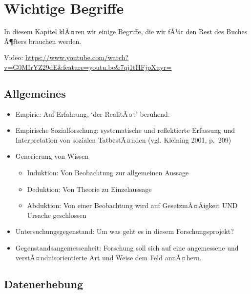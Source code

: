\documentclass[
]{book}
\providecommand{\tightlist}{%
  \setlength{\itemsep}{0pt}\setlength{\parskip}{0pt}}
\begin{document}
\hypertarget{wichtige-begriffe}{%
\chapter{Wichtige Begriffe}\label{wichtige-begriffe}}

In diesem Kapitel klÃ¤ren wir einige Begriffe, die wir fÃ¼r den Rest des Buches Ã¶fters brauchen werden.

Video: \url{https://www.youtube.com/watch?v=G0MIrYZ29dE\&feature=youtu.be\&7qj1tHFjpXuyr=}

\hypertarget{allgemeines-1}{%
\section{Allgemeines}\label{allgemeines-1}}

\begin{itemize}
\tightlist
\item
  Empirie: Auf Erfahrung, `der RealitÃ¤t' beruhend.
\item
  Empirische Sozialforschung: systematische und reflektierte Erfassung und Interpretation von sozialen TatbestÃ¤nden (vgl. Kleining 2001, p.~209)
\item
  Generierung von Wissen

  \begin{itemize}
  \tightlist
  \item
    Induktion: Von Beobachtung zur allgemeinen Aussage
  \item
    Deduktion: Von Theorie zu Einzelaussage
  \item
    Abduktion: Von einer Beobachtung wird auf GesetzmÃ¤Ãigkeit UND Ursache geschlossen\\
  \end{itemize}
\item
  Untersuchungsgegenstand: Um was geht es in diesem Forschungsprojekt?
\item
  Gegenstandsangemessenheit: Forschung soll sich auf eine angemessene und verstÃ¤ndnisorientierte Art und Weise dem Feld annÃ¤hern.
\end{itemize}

\hypertarget{datenerhebung}{%
\section{Datenerhebung}\label{datenerhebung}}
\end{document}
